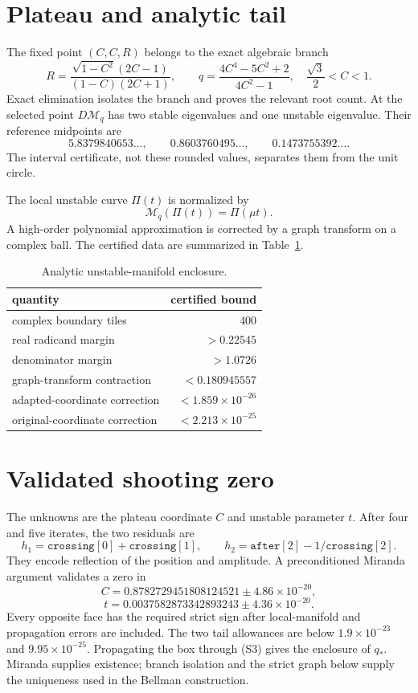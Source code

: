 \documentclass[11pt]{article}
\newcommand{\M}{\mathcal M}
\begin{document}
\section{Plateau and analytic tail}

The fixed point $(C,C,R)$ belongs to the exact algebraic branch
\[
 R=\frac{\sqrt{1-C^2}(2C-1)}{(1-C)(2C+1)},
 \qquad
 q=\frac{4C^4-5C^2+2}{4C^2-1},
 \quad \frac{\sqrt3}{2}<C<1.                    \tag{S3}
\]
Exact elimination isolates the branch and proves the relevant root count.  At
the selected point $D\M_q$ has two stable eigenvalues and one unstable
eigenvalue.  Their reference midpoints are
\[
 5.8379840653\ldots,\qquad
 0.8603760495\ldots,\qquad
 0.1473755392\ldots .
\]
The interval certificate, not these rounded values, separates them from the
unit circle.

The local unstable curve $\Pi(t)$ is normalized by
\[
 \M_q(\Pi(t))=\Pi(\mu t).                        \tag{S4}
\]
A high-order polynomial approximation is corrected by a graph transform on a
complex ball.  The certified data are summarized in Table~\ref{tab:tail}.

\begin{table}[h]
\centering
\begin{tabular}{lr}
\toprule
quantity & certified bound \\
\midrule
complex boundary tiles & 400 \\
real radicand margin & $>0.22545$ \\
denominator margin & $>1.0726$ \\
graph-transform contraction & $<0.180945557$ \\
adapted-coordinate correction & $<1.859\times10^{-26}$ \\
original-coordinate correction & $<2.213\times10^{-25}$ \\
\bottomrule
\end{tabular}
\caption{Analytic unstable-manifold enclosure.}
\label{tab:tail}
\end{table}

\section{Validated shooting zero}

The unknowns are the plateau coordinate $C$ and unstable parameter $t$.  After
four and five iterates, the two residuals are
\[
 h_1=\texttt{crossing}[0]+\texttt{crossing}[1],
 \qquad
 h_2=\texttt{after}[2]-1/\texttt{crossing}[2].   \tag{S5}
\]
They encode reflection of the position and amplitude.  A preconditioned
Miranda argument validates a zero in
\[
 C=0.8782729451808124521\pm4.86\times10^{-20},
\]
\[
 t=0.0037582873342893243\pm4.36\times10^{-20}.
\]
Every opposite face has the required strict sign after local-manifold and
propagation errors are included.  The two tail allowances are below
$1.9\times10^{-23}$ and $9.95\times10^{-25}$.  Propagating the box through
(S3) gives the enclosure of $q_*$.  Miranda supplies existence; branch
isolation and the strict graph below supply the uniqueness used in the
Bellman construction.
\end{document}
